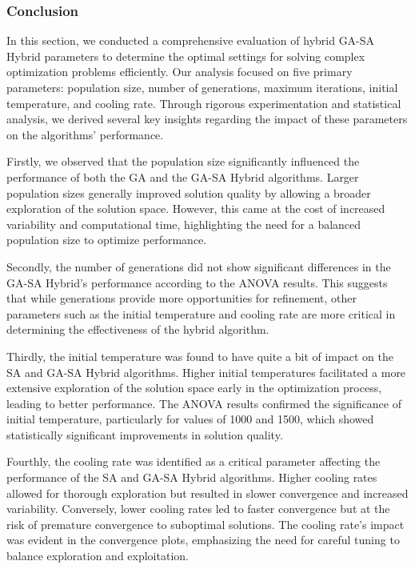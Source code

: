 \documentclass{article}
\begin{document}
    \subsubsection{Conclusion}

    In this section, we conducted a comprehensive evaluation of hybrid GA-SA Hybrid parameters to determine the optimal settings for solving complex optimization problems efficiently. Our analysis focused on five primary parameters: population size, number of generations, maximum iterations, initial temperature, and cooling rate. Through rigorous experimentation and statistical analysis, we derived several key insights regarding the impact of these parameters on the algorithms' performance.

    Firstly, we observed that the population size significantly influenced the performance of both the GA and the GA-SA Hybrid algorithms. Larger population sizes generally improved solution quality by allowing a broader exploration of the solution space. However, this came at the cost of increased variability and computational time, highlighting the need for a balanced population size to optimize performance.

    Secondly, the number of generations did not show significant differences in the GA-SA Hybrid's performance according to the ANOVA results. This suggests that while generations provide more opportunities for refinement, other parameters such as the initial temperature and cooling rate are more critical in determining the effectiveness of the hybrid algorithm.

    Thirdly, the initial temperature was found to have quite a bit of impact on the SA and GA-SA Hybrid algorithms. Higher initial temperatures facilitated a more extensive exploration of the solution space early in the optimization process, leading to better performance. The ANOVA results confirmed the significance of initial temperature, particularly for values of 1000 and 1500, which showed statistically significant improvements in solution quality.

    Fourthly, the cooling rate was identified as a critical parameter affecting the performance of the SA and GA-SA Hybrid algorithms. Higher cooling rates allowed for thorough exploration but resulted in slower convergence and increased variability. Conversely, lower cooling rates led to faster convergence but at the risk of premature convergence to suboptimal solutions. The cooling rate's impact was evident in the convergence plots, emphasizing the need for careful tuning to balance exploration and exploitation.
\end{document}
